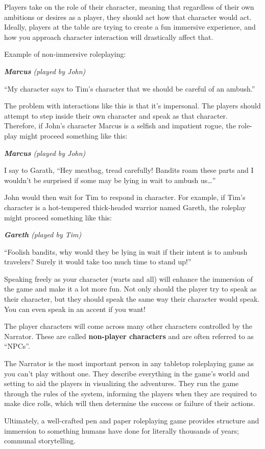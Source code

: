 Players take on the role of their character, meaning that regardless of their own ambitions or desires as a player, they should act how that character would act. Ideally, players at the table are trying to create a fun immersive experience, and how you approach character interaction will drastically affect that.

Example of non-immersive roleplaying:

\begin{displayquote}
\textit{\textbf{Marcus} (played by John)}

\enquote{My character says to Tim's character that we should be careful of an ambush.}
\end{displayquote}


The problem with interactions like this is that it's impersonal. The players should attempt to step inside their own character and speak as that character. Therefore, if John's character Marcus is a selfish and impatient rogue, the role-play might proceed something like this:

\begin{displayquote}
    \textit{\textbf{Marcus} (played by John)}
    
    I say to Garath, \enquote{Hey meatbag, tread carefully! Bandits roam these parts and I wouldn't be surprised if some may be lying in wait to ambush us…}
\end{displayquote}

John would then wait for Tim to respond in character. For example, if Tim's character is a hot-tempered thick-headed warrior named Gareth, the roleplay might proceed something like this:

\begin{displayquote}
    \textit{\textbf{Gareth} (played by Tim)}
    
    \enquote{Foolish bandits, why would they be lying in wait if their intent is to ambush travelers? Surely it would take too much time to stand up!}
\end{displayquote}

Speaking freely as your character (warts and all) will enhance the immersion of the game and make it a lot more fun. Not only should the player try to speak as their character, but they should speak the same way their character would speak. You can even speak in an accent if you want!

The player characters will come across many other characters controlled by the Narrator. These are called \textbf{non-player characters} and are often referred to as \enquote{NPCs}.

The Narrator is the most important person in any tabletop roleplaying game as you can't play without one. They describe everything in the game's world and setting to aid the players in visualizing the adventures. They run the game through the rules of the system, informing the players when they are required to make dice rolls, which will then determine the success or failure of their actions.

Ultimately, a well-crafted pen and paper roleplaying game provides structure and immersion to something humans have done for literally thousands of years; communal storytelling.